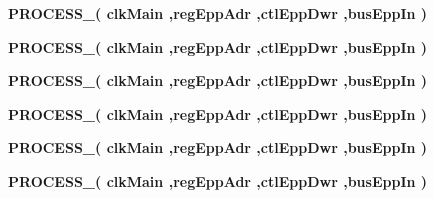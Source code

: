 \begin{DoxyCompactItemize}
\item 
{\bf P\-R\-O\-C\-E\-S\-S\-\_}{\bfseries  ( {\bfseries {\bfseries {\bf clk\-Main}} \textcolor{vhdlchar}{ }\textcolor{vhdlchar}{ }\textcolor{vhdlchar}{,}{\bfseries {\bf reg\-Epp\-Adr}} \textcolor{vhdlchar}{ }\textcolor{vhdlchar}{,}{\bfseries {\bf ctl\-Epp\-Dwr}} \textcolor{vhdlchar}{ }\textcolor{vhdlchar}{,}{\bfseries {\bf bus\-Epp\-In}} \textcolor{vhdlchar}{ }} )}
\item 
{\bf P\-R\-O\-C\-E\-S\-S\-\_}{\bfseries  ( {\bfseries {\bfseries {\bf clk\-Main}} \textcolor{vhdlchar}{ }\textcolor{vhdlchar}{ }\textcolor{vhdlchar}{,}{\bfseries {\bf reg\-Epp\-Adr}} \textcolor{vhdlchar}{ }\textcolor{vhdlchar}{,}{\bfseries {\bf ctl\-Epp\-Dwr}} \textcolor{vhdlchar}{ }\textcolor{vhdlchar}{,}{\bfseries {\bf bus\-Epp\-In}} \textcolor{vhdlchar}{ }} )}
\item 
{\bf P\-R\-O\-C\-E\-S\-S\-\_}{\bfseries  ( {\bfseries {\bfseries {\bf clk\-Main}} \textcolor{vhdlchar}{ }\textcolor{vhdlchar}{ }\textcolor{vhdlchar}{,}{\bfseries {\bf reg\-Epp\-Adr}} \textcolor{vhdlchar}{ }\textcolor{vhdlchar}{,}{\bfseries {\bf ctl\-Epp\-Dwr}} \textcolor{vhdlchar}{ }\textcolor{vhdlchar}{,}{\bfseries {\bf bus\-Epp\-In}} \textcolor{vhdlchar}{ }} )}
\item 
{\bf P\-R\-O\-C\-E\-S\-S\-\_}{\bfseries  ( {\bfseries {\bfseries {\bf clk\-Main}} \textcolor{vhdlchar}{ }\textcolor{vhdlchar}{ }\textcolor{vhdlchar}{,}{\bfseries {\bf reg\-Epp\-Adr}} \textcolor{vhdlchar}{ }\textcolor{vhdlchar}{,}{\bfseries {\bf ctl\-Epp\-Dwr}} \textcolor{vhdlchar}{ }\textcolor{vhdlchar}{,}{\bfseries {\bf bus\-Epp\-In}} \textcolor{vhdlchar}{ }} )}
\item 
{\bf P\-R\-O\-C\-E\-S\-S\-\_}{\bfseries  ( {\bfseries {\bfseries {\bf clk\-Main}} \textcolor{vhdlchar}{ }\textcolor{vhdlchar}{ }\textcolor{vhdlchar}{,}{\bfseries {\bf reg\-Epp\-Adr}} \textcolor{vhdlchar}{ }\textcolor{vhdlchar}{,}{\bfseries {\bf ctl\-Epp\-Dwr}} \textcolor{vhdlchar}{ }\textcolor{vhdlchar}{,}{\bfseries {\bf bus\-Epp\-In}} \textcolor{vhdlchar}{ }} )}
\item 
{\bf P\-R\-O\-C\-E\-S\-S\-\_}{\bfseries  ( {\bfseries {\bfseries {\bf clk\-Main}} \textcolor{vhdlchar}{ }\textcolor{vhdlchar}{ }\textcolor{vhdlchar}{,}{\bfseries {\bf reg\-Epp\-Adr}} \textcolor{vhdlchar}{ }\textcolor{vhdlchar}{,}{\bfseries {\bf ctl\-Epp\-Dwr}} \textcolor{vhdlchar}{ }\textcolor{vhdlchar}{,}{\bfseries {\bf bus\-Epp\-In}} \textcolor{vhdlchar}{ }} )}
\end{DoxyCompactItemize}
